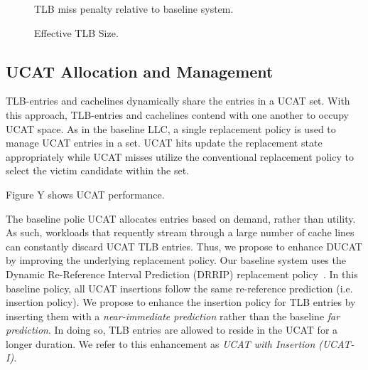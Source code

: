\begin{figure}[tp] 
  \vspace{0.in} \centering
  \centerline{}

  \caption{\small TLB miss penalty relative to baseline system.\normalsize}
  \label{fig:tlblat_UCAT} 
  \vspace{-0.1 in}
\end{figure}

\begin{figure}[tp] 
  \vspace{0.in} \centering
  \centerline{}

  \caption{\small Effective TLB Size.\normalsize}
  \label{fig:tlblat_UCAT} 
  \vspace{-0.1 in}
\end{figure}

\subsection{UCAT Allocation and Management}

TLB-entries and cachelines dynamically share the entries in a UCAT
set. With this approach, TLB-entries and cachelines contend with one
another to occupy UCAT space. As in the baseline LLC, a single
replacement policy is used to manage UCAT entries in a set. UCAT hits
update the replacement state appropriately while UCAT misses utilize
the conventional replacement policy to select the victim candidate
within the set.

Figure Y shows UCAT performance.

The baseline polic UCAT allocates entries based on demand, rather than
utility. As such, workloads that requently stream through a large
number of cache lines can constantly discard UCAT TLB entries. Thus,
we propose to enhance DUCAT by improving the underlying replacement
policy. Our baseline system uses the Dynamic Re-Reference Interval
Prediction (DRRIP) replacement policy~\cite{}. In this baseline
policy, all UCAT insertions follow the same re-reference prediction
(i.e. insertion policy). We propose to enhance the insertion policy
for TLB entries by inserting them with a {\em near-immediate
prediction} rather than the baseline {\em far prediction}. In doing
so, TLB entries are allowed to reside in the UCAT for a longer
duration. We refer to this enhancement as {\em UCAT with Insertion
(UCAT-I)}.

